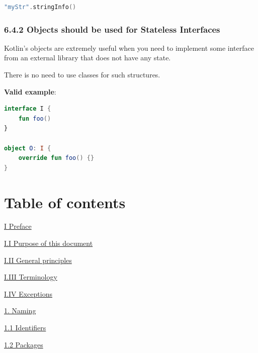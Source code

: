 {{{{{{{{{{{{{{{{\begin{lstlisting}[language=Kotlin]
"myStr".stringInfo()
\end{lstlisting}


\subsubsection*{\textbf{6.4.2 Objects should be used for Stateless Interfaces}}
\leavevmode\newline

\label{sec:6.4.2}

Kotlin’s objects are extremely useful when you need to implement some interface from an external library that does not have any state.

There is no need to use classes for such structures.



\textbf{Valid example}:

\begin{lstlisting}[language=Kotlin]
interface I {
    fun foo()
}

object O: I {
    override fun foo() {}
}
\end{lstlisting}
\section*{Table of contents}

\hspace{0.0cm}\hyperref[sec:]{I Preface}

\hspace{0.5cm}\hyperref[sec:]{ I.I Purpose of this document}

\hspace{0.5cm}\hyperref[sec:]{ I.II General principles}

\hspace{0.5cm}\hyperref[sec:]{ I.III Terminology}

\hspace{0.5cm}\hyperref[sec:]{ I.IV Exceptions}

\hspace{0.0cm}\hyperref[sec:]{}

\hspace{0.0cm}\hyperref[sec:1.]{1. Naming}

\hspace{0.0cm}\hyperref[sec:]{}

\hspace{0.5cm}\hyperref[sec:1.1]{ 1.1 Identifiers}

\hspace{0.5cm}\hyperref[sec:1.2]{ 1.2 Packages}

}}}}}}}}}}}}}}}}
